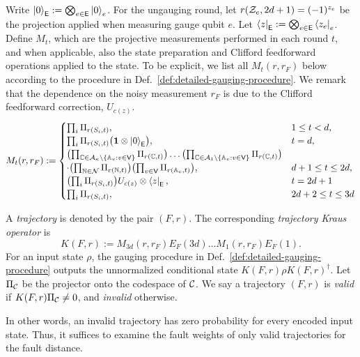 \documentclass[11pt]{article}
\begin{document}
Write $\ket{0}_{\mathsf{E}}:=\bigotimes_{e\in \mathsf{E}}\ket{0}_e$. 
For the ungauging round, let $r(\mathcal{Z}_e, 2d+1) = (-1)^{z_e}$ be the projection applied when measuring gauge qubit $e$.
Let $\bra{z}_{\mathsf{E}}:=\bigotimes_{e\in \mathsf{E}}\bra{z_e}_e$.
Define $M_t$, which are the projective measurements performed in each round $t$, and when applicable, also the state preparation and Clifford feedforward operations applied to the state. 
To be explicit, we list all $M_t(r,r_F)$ below according to the procedure in Def.~\ref{def:detailed-gauging-procedure}. We remark that the dependence on the noisy measurement $r_F$ is due to the Clifford feedforward correction, $U_{c(z)}$.
\begin{align}
\label{eq:cases-M}
    M_t(r,r_F):=\begin{cases}
    \prod_{i}\Pi_{r(S_i,t)}, & 1\le t < d,\\
    \prod_{i}\Pi_{r(S_i,t)} \bigl(
    \mathbf{1} \otimes \ket{0}_{\mathsf{E}}
    \bigr), & t = d,\\
    \bigl( \prod_{\mathbb{C}\in \mathcal{A}_\kappa \backslash \{\mathbb{A}_v:v\in \mathsf{V} \}} \Pi_{r(\mathbb{C},t)}\bigr)\dots
    \bigl( \prod_{\mathbb{C}\in \mathcal{A}_1 \backslash \{\mathbb{A}_v:v\in \mathsf{V} \}} \Pi_{r(\mathbb{C},t)}\bigr)\\
    \cdot \bigl(\prod_{\mathbb{N}\in \mathcal{N}}\Pi_{r(\mathbb{N},t)}\bigr)
    \bigl(
    \prod_{v\in\mathsf{V}}\Pi_{r(\mathbb{A}_v,t)}   
    \bigr)
    , & d+1 \le t \le 2d,\\
    \bigl(\prod_{i}\Pi_{r(S_i,t)}
    \bigr)
    U_{c(z)} \otimes
    \bra{z}_{\mathsf{E}}, & t=2d+1\\
    \prod_{i}\Pi_{r(S_i,t)}, & 2d+2\le t\le 3d
\end{cases}
\end{align}

\begin{definition}    
    A \emph{trajectory} is denoted by the pair $(F,r)$.
    The corresponding \emph{trajectory Kraus operator} is
    \[
    K(F,r) := M_{3d}(r,r_F)E_F(3d)\dots M_1(r,r_F) E_F(1).
    \]
    For an input state $\rho$, the gauging procedure in Def.~\ref{def:detailed-gauging-procedure} outputs the unnormalized conditional state $K(F,r)\rho K(F,r)^\dagger$.
    Let $\Pi_{\mathcal{C}}$ be the projector onto the codespace of $\mathcal{C}$. 
    We say a trajectory $(F,r)$ is \emph{valid} if $K(F,r)\Pi_{\mathcal{C}}\neq 0$, and \emph{invalid} otherwise.
\end{definition}

In other words, an invalid trajectory has zero probability for every encoded input state.
Thus, it suffices to examine the fault weights of only valid trajectories for the fault distance.
\end{document}
